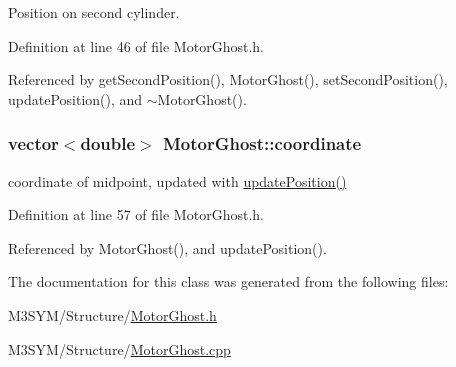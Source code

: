 Position on second cylinder. 



Definition at line 46 of file Motor\+Ghost.\+h.



Referenced by get\+Second\+Position(), Motor\+Ghost(), set\+Second\+Position(), update\+Position(), and $\sim$\+Motor\+Ghost().

\hypertarget{classMotorGhost_ad67e83cfbc9157c0eda5139071ba98f6}{
\subsubsection[{coordinate}]{\setlength{\rightskip}{0pt plus 5cm}vector$<$double$>$ Motor\+Ghost\+::coordinate}}\label{classMotorGhost_ad67e83cfbc9157c0eda5139071ba98f6}


coordinate of midpoint, updated with \hyperlink{classMotorGhost_af5160d203173a203b91bfe2e1461acf8}{update\+Position()} 



Definition at line 57 of file Motor\+Ghost.\+h.



Referenced by Motor\+Ghost(), and update\+Position().



The documentation for this class was generated from the following files\+:\begin{DoxyCompactItemize}
\item 
M3\+S\+Y\+M/\+Structure/\hyperlink{MotorGhost_8h}{Motor\+Ghost.\+h}\item 
M3\+S\+Y\+M/\+Structure/\hyperlink{MotorGhost_8cpp}{Motor\+Ghost.\+cpp}\end{DoxyCompactItemize}
